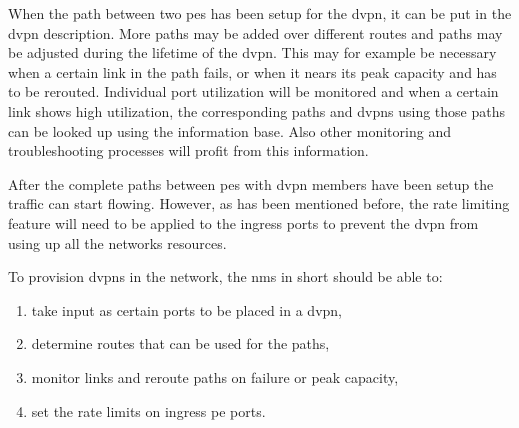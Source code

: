 When the path between two \acp{pe} has been setup for the \ac{dvpn}, it can be put in the \ac{dvpn} description. More paths may be added over different routes and paths may be adjusted during the lifetime of the \ac{dvpn}. This may for example be necessary when a certain link in the path fails, or when it nears its peak capacity and has to be rerouted. 
Individual port utilization will be monitored and when a certain link shows high utilization, the corresponding paths and \acp{dvpn} using those paths can be looked up using the information base. Also other monitoring and troubleshooting processes will profit from this information.


After the complete paths between \acp{pe} with \ac{dvpn} members have been setup the traffic can start flowing. However, as has been mentioned before, the rate limiting feature will need to be applied to the ingress ports to prevent the \ac{dvpn} from using up all the networks resources. 

To provision \acp{dvpn} in the network, the \ac{nms} in short should be able to:

\begin{enumerate}
	\item take input as certain ports to be placed in a \ac{dvpn},
	\item determine routes that can be used for the paths,
	\item monitor links and reroute paths on failure or peak capacity,
	\item set the rate limits on ingress \ac{pe} ports.
\end{enumerate}


